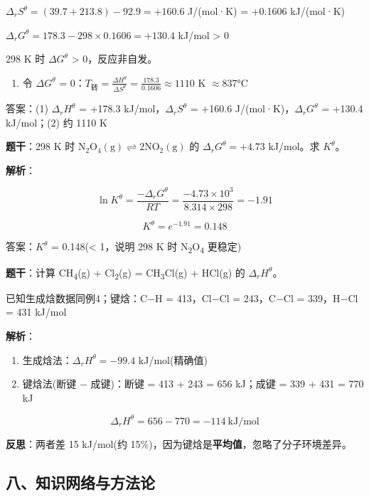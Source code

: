 \documentclass[a4paper,11pt]{ctexart}
\providecommand{\tightlist}{\setlength{\itemsep}{0pt}\setlength{\parskip}{0pt}}
\newcommand{\箭}{\ensuremath{\rightarrow}}
\newcommand{\左箭}{\ensuremath{\leftarrow}}
\newcommand{\上箭}{\ensuremath{\uparrow}}
\newcommand{\下箭}{\ensuremath{\downarrow}}
\newcommand{\衡}{\ensuremath{\rightleftharpoons}}
\newcommand{\双箭}{\ensuremath{\leftrightarrow}}
\newcommand{\约等于}{\ensuremath{\approx}}
\newcommand{\小于等于}{\ensuremath{\leq}}
\newcommand{\大于等于}{\ensuremath{\geq}}
\newcommand{\不等于}{\ensuremath{\neq}}
\newcommand{\西格马}{\ensuremath{\sigma}}
\newcommand{\派}{\ensuremath{\pi}}
\begin{document}
\(\Delta_r S^\theta = (39.7 + 213.8) - 92.9 = +160.6\) J/(mol·K) = +0.1606 kJ/(mol·K)

\(\Delta_r G^\theta = 178.3 - 298 \times 0.1606 = +130.4\) kJ/mol \textgreater{} 0

298 K 时 \(\Delta G^\theta\) \textgreater{} 0，反应非自发。

\begin{enumerate}
\def\labelenumi{(\arabic{enumi})}
\setcounter{enumi}{1}
\tightlist
\item
  令 \(\Delta G^\theta\) = 0：\(T_{\text{转}} = \frac{\Delta H^\theta}{\Delta S^\theta} = \frac{178.3}{0.1606} \approx 1110\) K \约等于 837°C
\end{enumerate}

答案：(1) \(\Delta_r H^\theta\) = +178.3 kJ/mol，\(\Delta_r S^\theta\) = +160.6 J/(mol·K)，\(\Delta_r G^\theta\) = +130.4 kJ/mol；(2) 约 1110 K

\textbf{题干}：298 K 时 \(\mathrm{N_2O_4(g) \rightleftharpoons 2NO_2(g)}\) 的 \(\Delta_r G^\theta = +4.73\) kJ/mol。求 \(K^\theta\)。

\textbf{解析}：

\[\ln K^\theta = \frac{-\Delta_r G^\theta}{RT} = \frac{-4.73 \times 10^3}{8.314 \times 298} = -1.91\]

\[K^\theta = e^{-1.91} = 0.148\]

答案：\(K^\theta\) = 0.148(\textless{} 1，说明 298 K 时 N\textsubscript{2}O\textsubscript{4} 更稳定)

\textbf{题干}：计算 CH\textsubscript{4}(g) + Cl\textsubscript{2}(g) = CH\textsubscript{3}Cl(g) + HCl(g) 的 \(\Delta_r H^\theta\)。

已知生成焓数据同例4；键焓：C−H = 413，Cl−Cl = 243，C−Cl = 339，H−Cl = 431 kJ/mol

\textbf{解析}：

\begin{enumerate}
\def\labelenumi{(\arabic{enumi})}
\item
  生成焓法：\(\Delta_r H^\theta = -99.4\) kJ/mol(精确值)
\item
  键焓法(断键 − 成键)：断键 = 413 + 243 = 656 kJ；成键 = 339 + 431 = 770 kJ
\end{enumerate}

\[\Delta_r H^\theta = 656 - 770 = -114\ \mathrm{kJ/mol}\]

\textbf{反思}：两者差 15 kJ/mol(约 15\%)，因为键焓是\textbf{平均值}，忽略了分子环境差异。

\subsection{八、知识网络与方法论}\label{ux516bux77e5ux8bc6ux7f51ux7edcux4e0eux65b9ux6cd5ux8bba}
\end{document}
